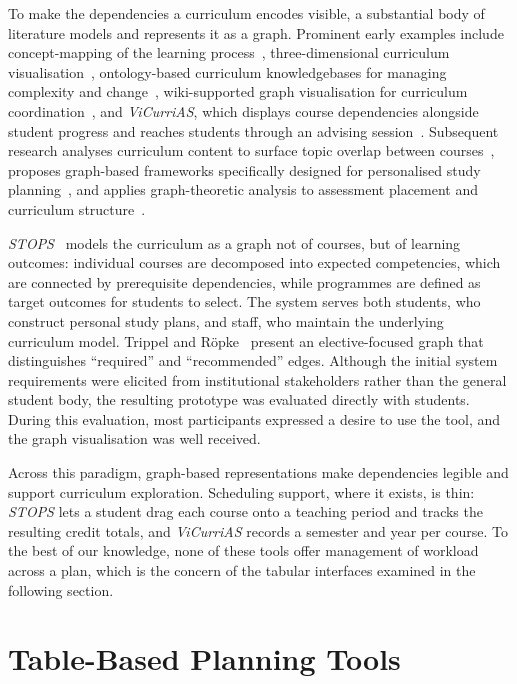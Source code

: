 To make the dependencies a curriculum encodes visible, a substantial body of literature models and represents it as a graph. Prominent early examples include concept-mapping of the learning process~\cite{nuutinen_visualization_2003}, three-dimensional curriculum visualisation~\cite{sommaruga_curriculum_2007}, ontology-based curriculum knowledgebases for managing complexity and change~\cite{dexter_ontology-based_2009}, wiki-supported graph visualisation for curriculum coordination~\cite{kabicher_coordinating_2009}, and \emph{ViCurriAS}, which displays course dependencies alongside student progress and reaches students through an advising session~\cite{zucker_vicurrias_2009}. Subsequent research analyses curriculum content to surface topic overlap between courses~\cite{siirtola_interactive_2013}, proposes graph-based frameworks specifically designed for personalised study planning~\cite{rollande_graph_2013}, and applies graph-theoretic analysis to assessment placement and curriculum structure~\cite{wasfi_optimizing_2023}.

\emph{STOPS}~\cite{auvinen_stops_2014} models the curriculum as a graph not of courses, but of learning outcomes: individual courses are decomposed into expected competencies, which are connected by prerequisite dependencies, while programmes are defined as target outcomes for students to select. The system serves both students, who construct personal study plans, and staff, who maintain the underlying curriculum model. Trippel and Röpke~\cite{trippel_developing_2025} present an elective-focused graph that distinguishes \enquote{required} and \enquote{recommended} edges. Although the initial system requirements were elicited from institutional stakeholders rather than the general student body, the resulting prototype was evaluated directly with students. During this evaluation, most participants expressed a desire to use the tool, and the graph visualisation was well received.

Across this paradigm, graph-based representations make dependencies legible and support curriculum exploration. Scheduling support, where it exists, is thin: \emph{STOPS} lets a student drag each course onto a teaching period and tracks the resulting credit totals, and \emph{ViCurriAS} records a semester and year per course. To the best of our knowledge, none of these tools offer management of workload across a plan, which is the concern of the tabular interfaces examined in the following section.

\section{Table-Based Planning Tools}
\label{sec:related-scheduling}

